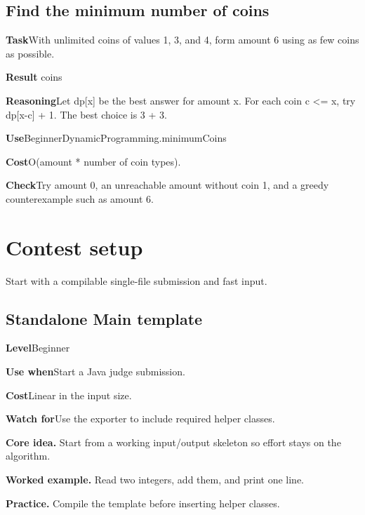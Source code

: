 \documentclass[10pt,letterpaper]{article}
\newcommand{\entrylabel}[1]{\textcolor{accent}{\bfseries #1}}
\begin{document}
\subsection*{Find the minimum number of coins}
\noindent\entrylabel{Task}\quad With unlimited coins of values 1, 3, and 4, form amount 6 using as few coins as possible.\par
\noindent\entrylabel{Result} coins\par
\noindent\entrylabel{Reasoning}\quad Let dp[x] be the best answer for amount x. For each coin c <= x, try dp[x-c] + 1. The best choice is 3 + 3.\par
\noindent\entrylabel{Use}\quad BeginnerDynamicProgramming.minimumCoins\par
\noindent\entrylabel{Cost}\quad O(amount * number of coin types).\par
\noindent\entrylabel{Check}\quad Try amount 0, an unreachable amount without coin 1, and a greedy counterexample such as amount 6.\par
\clearpage
{}\section{Contest setup}
\begin{guidebox}Start with a compilable single-file submission and fast input.\end{guidebox}
\subsection{Standalone Main template}
\begin{guidebox}\small
\entrylabel{Level}\quad Beginner\par
\entrylabel{Use when}\quad Start a Java judge submission.\par
\entrylabel{Cost}\quad Linear in the input size.\par
\entrylabel{Watch for}\quad Use the exporter to include required helper classes.\par
\end{guidebox}
\noindent\textbf{Core idea.} Start from a working input/output skeleton so effort stays on the algorithm.\par
\noindent\textbf{Worked example.} Read two integers, add them, and print one line.\par
\noindent\textbf{Practice.} Compile the template before inserting helper classes.\par
\end{document}
